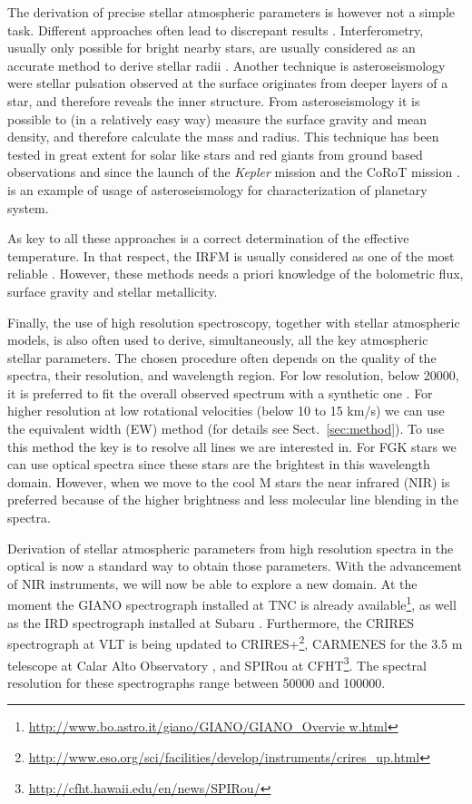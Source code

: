 \documentclass{aa}
\begin{document}
The derivation of precise stellar atmospheric parameters is however not
a simple task. Different approaches often lead to discrepant results
\citep[see e.g.][]{Santos13}. Interferometry, usually only possible for
bright nearby stars, are usually considered as an accurate method to
derive stellar radii \citep[e.g.][]{Boyajian2012}. Another technique
is asteroseismology were stellar pulsation observed at the surface
originates from deeper layers of a star, and therefore reveals the inner
structure. From asteroseismology it is possible to (in a relatively
easy way) measure the surface gravity and mean density, and therefore
\citep{Kjeldsen1995} calculate the mass and radius. This technique has
been tested in great extent for solar like stars and red giants from
ground based observations and since the launch of the \emph{Kepler}
mission and the CoRoT mission \citep{Michel2008,Huber2011,Huber2012}.
\cite{Campante2015} is an example of usage of asteroseismology for
characterization of planetary system.

As key to all these approaches is a correct determination
of the effective temperature. In that respect, the
IRFM is usually considered as one of the most reliable
\citep{Blackwell1977,Ramirez2005b,Casagrande2010}. However, these
methods needs a priori knowledge of the bolometric flux, surface gravity
and stellar metallicity.

Finally, the use of high resolution spectroscopy, together with stellar
atmospheric models, is also often used to derive, simultaneously,
all the key atmospheric stellar parameters. The chosen procedure
often depends on the quality of the spectra, their resolution, and
wavelength region. For low resolution, below 20000, it is preferred
to fit the overall observed spectrum with a synthetic one \citep[see
e.g.][]{Recio2006}. For higher resolution at low rotational velocities
(below 10 to 15 \si{km/s}) we can use the equivalent width (EW) method
(for details see Sect.~\ref{sec:method}). To use this method the key
is to resolve all lines we are interested in. For FGK stars we can use
optical spectra since these stars are the brightest in this wavelength
domain. However, when we move to the cool M stars the near infrared
(NIR) is preferred because of the higher brightness and less molecular
line blending in the spectra.

Derivation of stellar atmospheric parameters from high
resolution spectra in the optical is now a standard way
to obtain those parameters. With the advancement of NIR
instruments, we will now be able to explore a new domain. At
the moment the GIANO spectrograph installed at TNC is already
available\footnote{\url{http://www.bo.astro.it/giano/GIANO/GIANO_Overvie
w.html}}, as well as the IRD spectrograph installed at Subaru
\citep{IRD}. Furthermore, the CRIRES spectrograph at VLT is being
updated to
CRIRES+\footnote{\url{http://www.eso.org/sci/facilities/develop/instruments/crires_up.html}},
CARMENES for the 3.5 m telescope at Calar Alto Observatory \citep{CARMENES}, and
SPIRou at CFHT\footnote{\url{http://cfht.hawaii.edu/en/news/SPIRou/}}. The spectral
resolution for these spectrographs range between 50000 and 100000.
\end{document}

